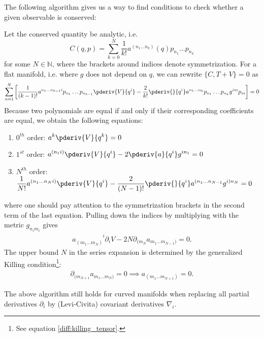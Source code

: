     The following algorithm gives us a way to find conditions to check whether a given observable is conserved:
    \begin{method}
        Let the conserved quantity be analytic, i.e. \[C(q, p) = \sum_{k=0}^N\frac{1}{k!}a^{(n_1\ldots n_k)}(q)p_{n_1}\ldots p_{n_k}\] for some $N\in\mathbb{N}$, where the brackets around indices denote symmetrization. For a flat manifold, i.e. where $g$ does not depend on $q$, we can rewrite $\{C, T+V\} = 0$ as \[\sum_{n = 1}^N\left[\frac{1}{(k-1)!}a^{n_1\ldots n_{k-1}i}p_{n_1}\ldots p_{n_{k-1}}\pderiv{V}{q^i} - \frac{2}{k!}\pderiv{}{q^i}a^{n_1\ldots n_k}p_{n_1}\ldots p_{n_k}g^{im}p_m\right] = 0\] Because two polynomials are equal if and only if their corresponding coefficients are equal, we obtain the following equations:
        \begin{enumerate}
            \item $0^{th}$ order: $\displaystyle a^k\pderiv{V}{q^k} = 0$
            \item $1^{st}$ order: $\displaystyle a^{(n_1i)}\pderiv{V}{q^i} - 2\pderiv{a}{q^i}g^{in_1} = 0$
            \item $N^{th}$ order: $\displaystyle \frac{1}{N!}a^{(n_1\ldots n_Ni)}\pderiv{V}{q^i} - \frac{2}{(N-1)!}\pderiv{}{q^i}a^{(n_1\ldots n_{N-1}}g^{i)n_N} = 0$
        \end{enumerate}
        where one should pay attention to the symmetrization brackets in the second term of the last equation. Pulling down the indices by multiplying with the metric $g_{n_im_i}$ gives
        \begin{gather}
            a_{(m_1\ldots m_N)}^{\phantom{(m_1\ldots m_N)}i}\partial_iV - 2N\partial_{(m_N}a_{m_1\ldots m_{N-1})} = 0.
        \end{gather}
        The upper bound $N$ in the series expansion is determined by the generalized Killing condition\footnote{See equation \ref{diff:killing_tensor}.}:
        \begin{gather}
            \partial_{(m_{N+1}}a_{m_1\ldots m_N)} = 0\implies a_{(m_1\ldots m_{N+1})} = 0.
        \end{gather}
    \end{method}
    \begin{remark}
        The above algorithm still holds for curved manifolds when replacing all partial derivatives $\partial_i$ by (Levi-Civita) covariant derivatives $\nabla_i$.
    \end{remark}

